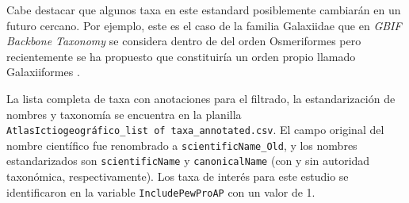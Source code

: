 \documentclass[sn-apa,pdflatex]{sn-jnl}
\newenvironment{Shaded}{\begin{snugshade}}{\end{snugshade}}
\newcommand{\AttributeTok}[1]{\textcolor[rgb]{0.13,0.29,0.53}{#1}}
\newcommand{\CommentTok}[1]{\textcolor[rgb]{0.56,0.35,0.01}{\textit{#1}}}
\newcommand{\ControlFlowTok}[1]{\textcolor[rgb]{0.13,0.29,0.53}{\textbf{#1}}}
\newcommand{\FunctionTok}[1]{\textcolor[rgb]{0.13,0.29,0.53}{\textbf{#1}}}
\newcommand{\NormalTok}[1]{#1}
\newcommand{\OtherTok}[1]{\textcolor[rgb]{0.56,0.35,0.01}{#1}}
\newcommand{\SpecialCharTok}[1]{\textcolor[rgb]{0.81,0.36,0.00}{\textbf{#1}}}
\newcommand{\StringTok}[1]{\textcolor[rgb]{0.31,0.60,0.02}{#1}}
\begin{document}
\begin{Shaded}
\end{Shaded}

Cabe destacar que algunos taxa en este estandard posiblemente cambiarán
en un futuro cercano. Por ejemplo, este es el caso de la familia
Galaxiidae que en \emph{GBIF Backbone Taxonomy} se considera dentro de
del orden Osmeriformes pero recientemente se ha propuesto que
constituiría un orden propio llamado Galaxiiformes
\citep{Betancur-R2017}.

La lista completa de taxa con anotaciones para el filtrado, la
estandarización de nombres y taxonomía se encuentra en la planilla
\texttt{AtlasIctiogeográfico\_list\ of\ taxa\_annotated.csv}. El campo
original del nombre científico fue renombrado a
\texttt{scientificName\_Old}, y los nombres estandarizados son
\texttt{scientificName} y \texttt{canonicalName} (con y sin autoridad
taxonómica, respectivamente). Los taxa de interés para este estudio se
identificaron en la variable \texttt{IncludePewProAP} con un valor de 1.
\end{document}
